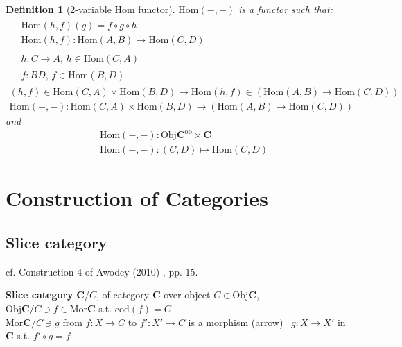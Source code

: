 \documentclass[10pt]{amsart}
\newtheorem{definition}{Definition}
\begin{document}
\begin{multicols*}{2}
\begin{definition}[2-variable Hom functor]
$\text{Hom}(-,-)$ is a functor such that:
\[
\begin{gathered}
\begin{aligned} 
& \text{Hom}(h, f)(g) = f\circ g \circ h \\
& \text{Hom}(h, f) : \text{Hom}(A, B) \to \text{Hom}(C, D) 
\end{aligned} \\
\begin{aligned}
& h : C \to A, \, h \in \text{Hom}(C,A) \\ 
& f: B\dot D, \, f \in \text{Hom}(B,D)
\end{aligned} \\
(h,f) \in \text{Hom}(C,A) \times \text{Hom}(B,D) \mapsto \text{Hom}(h,f) \in (\text{Hom}(A,B) \to \text{Hom}(C,D)) \\
\text{Hom}(-,-) : \text{Hom}(C,A) \times \text{Hom}(B,D) \to (\text{Hom}(A,B) \to \text{Hom}(C,D) )
\end{gathered}
\]
and 
\[
\begin{aligned}
& \text{Hom}(-,-) : \text{Obj}\mathbf{C}^{\text{op}} \times \mathbf{C} \\ 
& \text{Hom}(-,-) : (C,D) \mapsto \text{Hom}(C,D)
\end{aligned}
\]
\end{definition}


\section{Construction of Categories}

\subsection{Slice category}

cf. Construction 4 of Awodey (2010) \cite{Awod2010}, pp. 15.

\textbf{Slice category} $\mathbf{C}/C$, of category $\mathbf{C}$ over object $C \in \text{Obj}\mathbf{C}$, \\
$\text{Obj}\mathbf{C}/C \ni f \in \text{Mor}\mathbf{C}$ s.t. $\text{cod}(f) = C$ \\
$\text{Mor}\mathbf{C}/C \ni g$ from $f:X \to C$ to $f':X' \to C$ is a morphism (arrow) \, $g: X\to X'$ in $\mathbf{C}$ s.t. $f'\circ g = f$


\end{multicols*}
\end{document}
